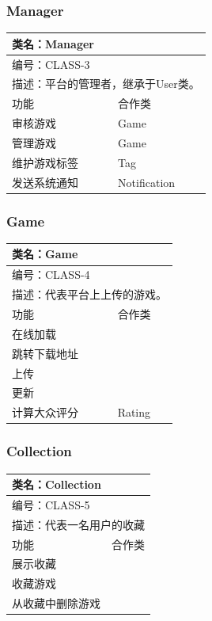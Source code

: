 \documentclass[12pt]{ctexart} %
\begin{document}
\subsubsection{Manager}
\begin{tabular}{|l|l|}
  \hline
  \multicolumn{2}{|l|}{类名：Manager} \\
  \hline
  \multicolumn{2}{|l|}{编号：CLASS-3} \\
  \hline
  \multicolumn{2}{|l|}{描述：平台的管理者，继承于User类。} \\
  \hline
  功能 & 合作类 \\
  \hline
  审核游戏 & Game\\
  \hline
  管理游戏 & Game\\
  \hline
  维护游戏标签 & Tag\\
  \hline
  发送系统通知 & Notification\\
  \hline
  \end{tabular}

\subsubsection{Game}
\begin{tabular}{|l|l|}
  \hline
  \multicolumn{2}{|l|}{类名：Game} \\
  \hline
  \multicolumn{2}{|l|}{编号：CLASS-4} \\
  \hline
  \multicolumn{2}{|l|}{描述：代表平台上上传的游戏。} \\
  \hline
  功能 & 合作类 \\
  \hline
  在线加载 & \\
  \hline
  跳转下载地址 & \\
  \hline
  上传 &  \\
  \hline
  更新 &  \\
  \hline
  计算大众评分 & Rating \\
  \hline
  \end{tabular}

\subsubsection{Collection}
\begin{tabular}{|l|l|}
  \hline
  \multicolumn{2}{|l|}{类名：Collection} \\
  \hline
  \multicolumn{2}{|l|}{编号：CLASS-5} \\
  \hline
  \multicolumn{2}{|l|}{描述：代表一名用户的收藏} \\
  \hline
  功能 & 合作类 \\
  \hline
  展示收藏 &  \\
  \hline
  收藏游戏 & \\
  \hline
  从收藏中删除游戏 & \\
  \hline
  \end{tabular}
\end{document}
